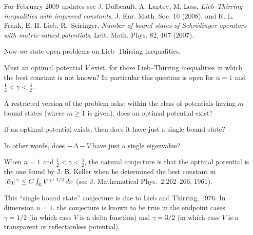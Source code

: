 \documentclass[12pt,letterpaper, reqno]{amsart}
\begin{document}
For February 2009 updates see J. Dolbeault, A. Laptev, M. Loss, \emph{Lieb--Thirring inequalities with improved constants}, J. Eur. Math. Soc. 10 (2008), and R. L. Frank, E. H. Lieb, R.~Seiringer, \emph{Number of bound states of Schr\"odinger operators with matrix-valued potentials}, Lett. Math. Phys. 82, 107 (2007).

\vspace{6pt}
Now we state open problems on Lieb--Thirring
inequalities.



\begin{problem}
 Must an optimal potential $V$ exist, for
those Lieb--Thirring inequalities in which the best constant is not
known? In particular this question is open for $n=1$ and
$\frac{1}{2} < \gamma < \frac{3}{2}$.
\end{problem}

\begin{problem}
A restricted version of the problem asks: within the class of
potentials having $m$ bound states (where $m \geq 1$ is given), does
an optimal potential exist?
\end{problem}




\begin{problemblock}


\begin{problem}
 If an optimal potential
exists, then does it have just a single bound state?
\end{problem}

In other
words, does $-\Delta - V$ have just a single eigenvalue?


\begin{remark}
When $n=1$
and $\frac{1}{2} < \gamma < \frac{3}{2}$, the natural conjecture is
that the optimal potential is the one found by J. B. Keller when he
determined the best constant in $|E_1|^\gamma \leq C \int_\mathbb R
V^{\gamma + 1/2} \, dx$ (see J. Mathematical Phys.\ 2:262--266,
1961).
\end{remark}

\begin{remark}
This ``single bound state'' conjecture is due to Lieb and Thirring,
1976. In dimension $n=1$, the conjecture is known to be true in the
endpoint cases $\gamma=1/2$ (in which case $V$ is a delta function)
and $\gamma=3/2$ (in which case $V$ is a transparent or
reflectionless potential).
\end{remark}

\end{problemblock}
\end{document}
